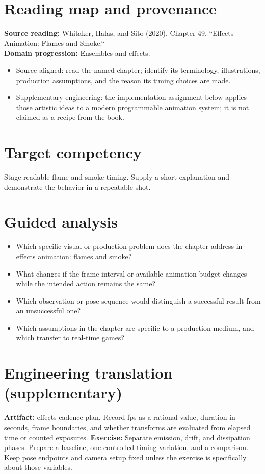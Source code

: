 \documentclass[10pt,letterpaper]{article}
\begin{document}
\makedoctitle
\makedocsummary

\section{Reading map and provenance}
\textbf{Source reading:} Whitaker, Halas, and Sito (2020), Chapter 49, ``Effects Animation: Flames and Smoke.``\\
\textbf{Domain progression:} Ensembles and effects.
\begin{itemize}
\item Source-aligned: read the named chapter; identify its terminology, illustrations, production assumptions, and the reason its timing choices are made.
\item Supplementary engineering: the implementation assignment below applies those artistic ideas to a modern programmable animation system; it is not claimed as a recipe from the book.
\end{itemize}
\section{Target competency}
Stage readable flame and smoke timing. Supply a short explanation and demonstrate the behavior in a repeatable shot.
\section{Guided analysis}
\begin{itemize}
\item Which specific visual or production problem does the chapter address in effects animation: flames and smoke?
\item What changes if the frame interval or available animation budget changes while the intended action remains the same?
\item Which observation or pose sequence would distinguish a successful result from an unsuccessful one?
\item Which assumptions in the chapter are specific to a production medium, and which transfer to real-time games?
\end{itemize}
\section{Engineering translation (supplementary)}
\textbf{Artifact:} effects cadence plan. Record fps as a rational value, duration in seconds, frame boundaries, and whether transforms are evaluated from elapsed time or counted exposures.
\textbf{Exercise:} Separate emission, drift, and dissipation phases. Prepare a baseline, one controlled timing variation, and a comparison. Keep pose endpoints and camera setup fixed unless the exercise is specifically about those variables.
\end{document}
